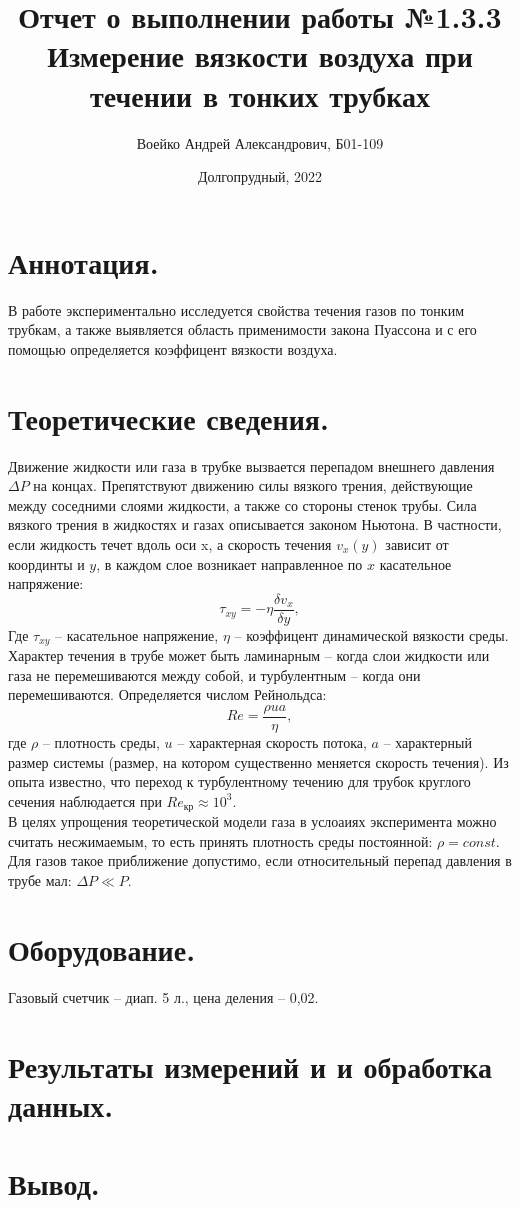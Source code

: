 ﻿\documentclass[a4paper,11pt]{article}
\title{Отчет о выполнении работы №1.3.3\\Измерение вязкости воздуха при течении в тонких трубках}
\author{Воейко Андрей Александрович, Б01-109}
\date{Долгопрудный, 2022}
\begin{document}
\maketitle
\newpage
\section{Аннотация.}
В работе экспериментально исследуется свойства течения газов по тонким трубкам, а также выявляется область применимости закона Пуассона и с его помощью определяется коэффицент вязкости воздуха.
\section{Теоретические сведения.}
Движение жидкости или газа в трубке вызвается перепадом внешнего давления $\Delta P$ на концах. Препятствуют движению силы вязкого трения, действующие между соседними слоями жидкости, а также со стороны стенок трубы. Сила вязкого трения в жидкостях и газах описывается законом Ньютона. В частности, если жидкость течет вдоль оси x, а скорость течения $v_{x}(y)$ зависит от координты и $y$, в каждом слое возникает направленное по $x$ касательное напряжение:
\begin{equation}    \label{eq1}
  \tau_{xy} = -\eta \frac{\delta v_{x}}{\delta y},
\end{equation}
Где $\tau_{xy}$ -- касательное напряжение, $\eta$ -- коэффицент динамической вязкости среды.
Характер течения в трубе может быть ламинарным -- когда слои жидкости или газа не перемешиваются между собой, и турбулентным -- когда они перемешиваются. Определяется числом Рейнольдса:
\begin{equation}    \label{eq2}
  Re = \frac{\rho u a}{\eta},
\end{equation}
где $\rho$ -- плотность среды, $u$ -- характерная скорость потока, $a$ -- характерный размер системы (размер, на котором существенно меняется скорость течения). Из опыта известно, что переход к турбулентному течению для трубок круглого сечения наблюдается при $Re_{кр} \approx 10^{3}$.\\
В целях упрощения теоретической модели газа в услоаиях эксперимента можно считать несжимаемым, то есть принять плотность среды постоянной: $\rho = const$. Для газов такое приближение допустимо, если относительный перепад давления в трубе мал: $\Delta P \ll P$.
\section{Оборудование.}
Газовый счетчик -- диап. 5 л., цена деления -- 0,02.
\section{Результаты измерений и и обработка данных.}
\section{Вывод.}
\end{document}
